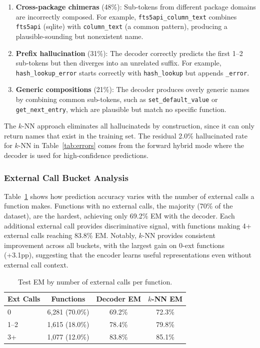 \documentclass[sigconf,nonacm]{acmart}
\begin{document}
\begin{enumerate}
    \item \textbf{Cross-package chimeras} (48\%): Sub-tokens from different package domains are incorrectly composed. For example, \texttt{fts5api\_column\_text} combines \texttt{fts5api} (sqlite) with \texttt{column\_text} (a common pattern), producing a plausible-sounding but nonexistent name.

    \item \textbf{Prefix hallucination} (31\%): The decoder correctly predicts the first 1--2 sub-tokens but then diverges into an unrelated suffix. For example, \texttt{hash\_lookup\_\allowbreak{}error} starts correctly with \texttt{hash\_lookup} but appends \texttt{\_error}.

    \item \textbf{Generic compositions} (21\%): The decoder produces overly generic names by combining common sub-tokens, such as \texttt{set\_default\_value} or \texttt{get\_next\_\allowbreak{}entry}, which are plausible but match no specific function.
\end{enumerate}

The $k$-NN approach eliminates all hallucinateds by construction, since it can only return names that exist in the training set. The residual 2.0\% hallucinated rate for $k$-NN in Table~\ref{tab:errors} comes from the forward hybrid mode where the decoder is used for high-confidence predictions.

\subsubsection{External Call Bucket Analysis}

Table~\ref{tab:ext_buckets} shows how prediction accuracy varies with the number of external calls a function makes. Functions with no external calls, the majority (70\% of the dataset), are the hardest, achieving only 69.2\% EM with the decoder. Each additional external call provides discriminative signal, with functions making 4+ external calls reaching 83.8\% EM. Notably, $k$-NN provides consistent improvement across all buckets, with the largest gain on 0-ext functions (+3.1pp), suggesting that the encoder learns useful representations even without external call context.

\begin{table}[t]
    \centering
    \caption{Test EM by number of external calls per function.}
    \label{tab:ext_buckets}
    \footnotesize
    \begin{tabular}{lccc}
        \toprule
        \textbf{Ext Calls} & \textbf{Functions} & \textbf{Decoder EM} & \textbf{$k$-NN EM} \\
        \midrule
        0 & 6,281 (70.0\%) & 69.2\% & 72.3\% \\
        1--2 & 1,615 (18.0\%) & 78.4\% & 79.8\% \\
        3+ & 1,077 (12.0\%) & 83.8\% & 85.1\% \\
        \bottomrule
    \end{tabular}
\end{table}
\end{document}
